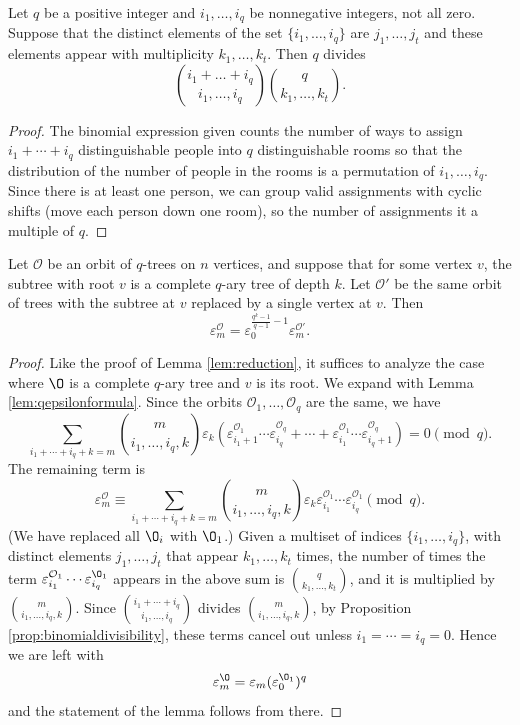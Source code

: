 \begin{proposition}
\label{prop:binomialdivisibility}
Let $q$ be a positive integer and $i_1, \dotsc, i_q$ be nonnegative integers, not all zero. Suppose that the distinct elements of the set $\{i_1, \dotsc, i_q\}$ are $j_1, \dotsc, j_t$ and these elements appear with multiplicity $k_1, \dotsc, k_t$. Then $q$ divides
\[\binom{i_1+\dotsc +i_q}{i_1, \dotsc, i_q}\binom{q}{k_1, \dotsc, k_t}.\]
\end{proposition}
\begin{proof}
    The binomial expression given counts the number of ways to assign $i_1+\dotsb+i_q$ distinguishable people into $q$ distinguishable rooms so that the distribution of the number of people in the rooms is a permutation of $i_1, \dotsc, i_q$. Since there is at least one person, we can group valid assignments with cyclic shifts (move each person down one room), so the number of assignments it a multiple of $q$.
\end{proof}

\begin{lemma}
\label{lem:qreduction}
    Let $\mathcal{O}$ be an orbit of $q$-trees on $n$ vertices, and suppose that for some vertex $v$, the subtree with root $v$ is a complete $q$-ary tree of depth $k$. Let $\mathcal{O}'$ be the same orbit of trees with the subtree at $v$ replaced by a single vertex at $v$. Then \[\varepsilon_m^{\mathcal{O}}=\varepsilon_0^{\frac{q^k-1}{q-1}-1}\varepsilon_m^{\mathcal{O}'}.\]
\end{lemma}
\begin{proof}
    Like the proof of Lemma \ref{lem:reduction}, it suffices to analyze the case where $\O$ is a complete $q$-ary tree and $v$ is its root. We expand with Lemma \ref{lem:qepsilonformula}. Since the orbits $\mathcal{O}_1, \dotsc, \mathcal{O}_q$ are the same, we have
    \[\sum_{i_1+\dotsb+i_q+k=m}\binom{m}{i_1, \dotsc, i_q, k}\varepsilon_{k}(\varepsilon^{\mathcal{O}_1}_{i_1+1}\dotsm\varepsilon^{\mathcal{O}_q}_{i_q}+\dotsb+\varepsilon^{\mathcal{O}_1}_{i_1}\dotsm\varepsilon^{\mathcal{O}_q}_{i_q+1})=0\pmod{q}.\]
    The remaining term is\[\varepsilon^{\mathcal{O}}_{m} \equiv\sum_{i_1+\dotsb+i_q+k=m}\binom{m}{i_1, \dotsc, i_q, k}\varepsilon_{k}\varepsilon^{\mathcal{O}_1}_{i_1}\dotsm\varepsilon^{\mathcal{O}_1}_{i_q}\pmod{q}.\]
    (We have replaced all $\O_i$ with $\O_1$.) Given a multiset of indices $\{i_1, \dotsc, i_q\}$, with distinct elements $j_1, \dotsc, j_t$ that appear $k_1, \dotsc, k_t$ times, the number of times the term $\varepsilon^{\mathcal{O}_1}_{i_1}\dotsm \varepsilon^{\O_1}_{i_q}$ appears in the above sum is $\binom{q}{k_1,\dotsc, k_t}$, and it is multiplied by $\binom{m}{i_1, \dotsc, i_q, k}$. Since $\binom{i_1+\dotsb +i_q}{i_1, \dotsc, i_q}$ divides $\binom{m}{i_1, \dotsc, i_q, k}$, by Proposition \ref{prop:binomialdivisibility}, these terms cancel out unless $i_1=\dotsb=i_q=0$. Hence we are left with
    \[\varepsilon^{\O}_m=\varepsilon_m(\varepsilon^{\O_1}_0)^q\]
    and the statement of the lemma follows from there.
\end{proof}

